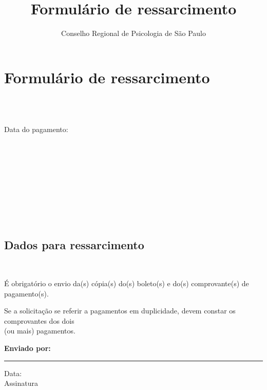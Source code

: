 \documentclass[openright, oneside, a4paper, article, brazil]{abntex2}
\title{Formulário de ressarcimento}
\author{Conselho Regional de Psicologia de São Paulo}
\newlength{\doisbox}
\begin{document}
\pagestyle{crp}
\centering
\Form
\setasuspacing{\DoubleSpacing}
\section{Formulário de ressarcimento}%

\raggedright
{}\hfill {}\\

\\
\vspace{-0.6\baselineskip}

Data do pagamento: 
\vspace{0.5\baselineskip}

\\
\\
\\
\\
\\
\\
\\
\\


\subsection{Dados para ressarcimento}


 \hfill%
 \hfill%
\\%
\vspace{\baselineskip}

\begin{framed}
    \begin{minipage}[t]{\boxlarg}
        \hfill{\null}
    \end{minipage}%
    \begin{minipage}[t]{\textwidth-\doisbox}
        \small\centering\setasuspacing{\SingleSpacing}
        É obrigatório o envio da(s) cópia(s) do(s) boleto(s) e do(s) comprovante(s) de pagamento(s).
        \vspace{\baselineskip}

        Se a solicitação se referir a pagamentos em duplicidade, devem constar os comprovantes dos dois \\(ou mais) pagamentos.
        \vspace{\baselineskip}
    \end{minipage}
\end{framed}
\vspace{2\baselineskip}

\textbf{Enviado por:}
\vfill\small

\rule{24em}{0.4pt}\hfill Data: \\
Assinatura
\end{document}
